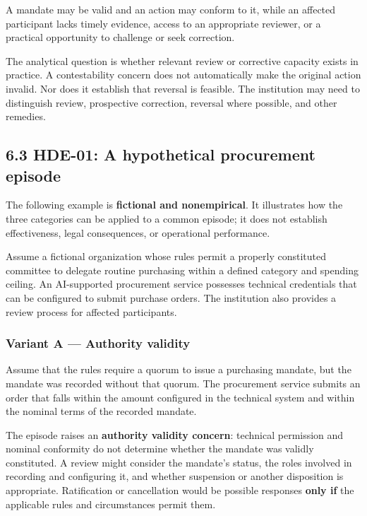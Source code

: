 \documentclass[
  10pt,
]{article}
\newcounter{none} %
\begin{document}
A mandate may be valid and an action may conform to it, while an
affected participant lacks timely evidence, access to an appropriate
reviewer, or a practical opportunity to challenge or seek correction.

The analytical question is whether relevant review or corrective
capacity exists in practice. A contestability concern does not
automatically make the original action invalid. Nor does it establish
that reversal is feasible. The institution may need to distinguish
review, prospective correction, reversal where possible, and other
remedies.

\subsection{6.3 HDE-01: A hypothetical procurement
episode}\label{hde-01-a-hypothetical-procurement-episode}

The following example is \textbf{fictional and nonempirical}. It
illustrates how the three categories can be applied to a common episode;
it does not establish effectiveness, legal consequences, or operational
performance.

Assume a fictional organization whose rules permit a properly
constituted committee to delegate routine purchasing within a defined
category and spending ceiling. An AI-supported procurement service
possesses technical credentials that can be configured to submit
purchase orders. The institution also provides a review process for
affected participants.

\subsubsection{Variant A --- Authority
validity}\label{variant-a-authority-validity}

Assume that the rules require a quorum to issue a purchasing mandate,
but the mandate was recorded without that quorum. The procurement
service submits an order that falls within the amount configured in the
technical system and within the nominal terms of the recorded mandate.

The episode raises an \textbf{authority validity concern}: technical
permission and nominal conformity do not determine whether the mandate
was validly constituted. A review might consider the mandate's status,
the roles involved in recording and configuring it, and whether
suspension or another disposition is appropriate. Ratification or
cancellation would be possible responses \textbf{only if} the applicable
rules and circumstances permit them.
\end{document}
